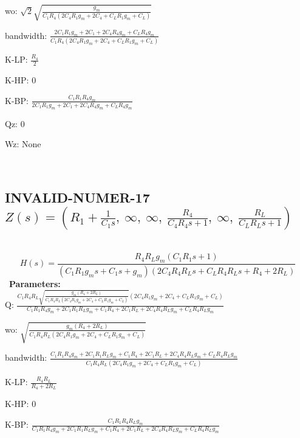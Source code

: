 \documentclass{article}
\begin{document}
wo: $\sqrt{2} \sqrt{\frac{g_{m}}{C_{1} R_{4} \left(2 C_{4} R_{1} g_{m} + 2 C_{4} + C_{L} R_{1} g_{m} + C_{L}\right)}}$\ 

bandwidth: $\frac{2 C_{1} R_{1} g_{m} + 2 C_{1} + 2 C_{4} R_{4} g_{m} + C_{L} R_{4} g_{m}}{C_{1} R_{4} \left(2 C_{4} R_{1} g_{m} + 2 C_{4} + C_{L} R_{1} g_{m} + C_{L}\right)}$\ 

K-LP: $\frac{R_{4}}{2}$\ 

K-HP: $0$\ 

K-BP: $\frac{C_{1} R_{1} R_{4} g_{m}}{2 C_{1} R_{1} g_{m} + 2 C_{1} + 2 C_{4} R_{4} g_{m} + C_{L} R_{4} g_{m}}$\ 

Qz: $0$\ 

Wz: $\text{None}$\ 

\ 

\subsection{INVALID-NUMER-17 $Z(s) = \left( R_{1} + \frac{1}{C_{1} s}, \  \infty, \  \infty, \  \frac{R_{4}}{C_{4} R_{4} s + 1}, \  \infty, \  \frac{R_{L}}{C_{L} R_{L} s + 1}\right)$ } \ 
\textbf{\[H(s) = \frac{R_{4} R_{L} g_{m} \left(C_{1} R_{1} s + 1\right)}{\left(C_{1} R_{1} g_{m} s + C_{1} s + g_{m}\right) \left(2 C_{4} R_{4} R_{L} s + C_{L} R_{4} R_{L} s + R_{4} + 2 R_{L}\right)}\] } \ 
\textbf{Parameters:}\\ 

Q: $\frac{C_{1} R_{4} R_{L} \sqrt{\frac{g_{m} \left(R_{4} + 2 R_{L}\right)}{C_{1} R_{4} R_{L} \left(2 C_{4} R_{1} g_{m} + 2 C_{4} + C_{L} R_{1} g_{m} + C_{L}\right)}} \left(2 C_{4} R_{1} g_{m} + 2 C_{4} + C_{L} R_{1} g_{m} + C_{L}\right)}{C_{1} R_{1} R_{4} g_{m} + 2 C_{1} R_{1} R_{L} g_{m} + C_{1} R_{4} + 2 C_{1} R_{L} + 2 C_{4} R_{4} R_{L} g_{m} + C_{L} R_{4} R_{L} g_{m}}$\ 

wo: $\sqrt{\frac{g_{m} \left(R_{4} + 2 R_{L}\right)}{C_{1} R_{4} R_{L} \left(2 C_{4} R_{1} g_{m} + 2 C_{4} + C_{L} R_{1} g_{m} + C_{L}\right)}}$\ 

bandwidth: $\frac{C_{1} R_{1} R_{4} g_{m} + 2 C_{1} R_{1} R_{L} g_{m} + C_{1} R_{4} + 2 C_{1} R_{L} + 2 C_{4} R_{4} R_{L} g_{m} + C_{L} R_{4} R_{L} g_{m}}{C_{1} R_{4} R_{L} \left(2 C_{4} R_{1} g_{m} + 2 C_{4} + C_{L} R_{1} g_{m} + C_{L}\right)}$\ 

K-LP: $\frac{R_{4} R_{L}}{R_{4} + 2 R_{L}}$\ 

K-HP: $0$\ 

K-BP: $\frac{C_{1} R_{1} R_{4} R_{L} g_{m}}{C_{1} R_{1} R_{4} g_{m} + 2 C_{1} R_{1} R_{L} g_{m} + C_{1} R_{4} + 2 C_{1} R_{L} + 2 C_{4} R_{4} R_{L} g_{m} + C_{L} R_{4} R_{L} g_{m}}$\ 
\end{document}
